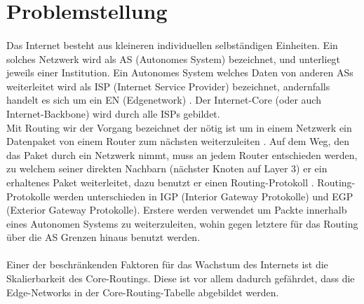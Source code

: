 \section{Problemstellung}


\paragraph{}
Das Internet besteht aus kleineren individuellen selbständigen Einheiten. Ein solches Netzwerk wird als AS (Autonomes System) bezeichnet, und unterliegt jeweils einer Institution. Ein Autonomes System welches Daten von anderen ASs weiterleitet wird als ISP (Internet Service Provider) bezeichnet, andernfalls handelt es sich um ein EN  (Edgenetwork) \cite{Mahorta:2002:IR}. Der Internet-Core (oder auch Internet-Backbone) wird durch alle ISPs gebildet.\\

Mit Routing wir der Vorgang bezeichnet der nötig ist um in einem Netzwerk ein Datenpaket von einem Router zum nächsten weiterzuleiten \cite{Mahorta:2002:IR}. Auf dem Weg, den das Paket durch ein Netzwerk nimmt, muss an jedem Router entschieden werden, zu welchem seiner direkten Nachbarn (nächster Knoten auf Layer 3) er ein erhaltenes Paket weiterleitet, dazu benutzt er einen Routing-Protokoll \cite{Tanenbaum:2003:CN}. Routing-Protokolle werden unterschieden in IGP (Interior Gateway Protokolle) und EGP (Exterior Gateway Protokolle). Erstere werden verwendet um Packte innerhalb eines Autonomen Systems zu weiterzuleiten, wohin gegen letztere für das Routing über die AS Grenzen hinaus benutzt werden.\\


\paragraph{}
Einer der beschränkenden Faktoren für das Wachstum des Internets ist die Skalierbarkeit des Core-Routings. Diese ist vor allem dadurch gefährdet, dass die Edge-Networks in der Core-Routing-Tabelle abgebildet werden.

